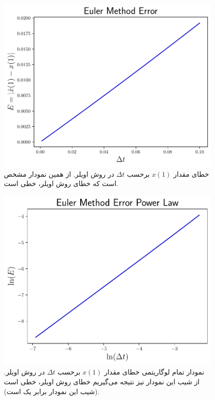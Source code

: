 \documentclass[12pt,a4paper]{article}
\begin{document}
	\subsection*{}
	\begin{figure}[h!]
		\centering
		\includegraphics[width=0.65\linewidth]{fig/euler-error}
		\caption{خطای مقدار $x(1)$ برحسب $\Delta{t}$ در روش اویلر. از همین نمودار مشخص است که خطای روش اویلر، خطی است.}
	\end{figure}
	\begin{figure}[h!]
		\centering
		\includegraphics[width=0.65\linewidth]{fig/euler-error-loglog}
		\caption{نمودار تمام لوگاریتمی خطای مقدار $x(1)$ برحسب $\Delta{t}$ در روش اویلر.
			از شیب این نمودار نیز نتیجه می‌گیریم خطای روش اویلر، خطی است (شیب این نمودار برابر یک است).}
	\end{figure}
\end{document}
